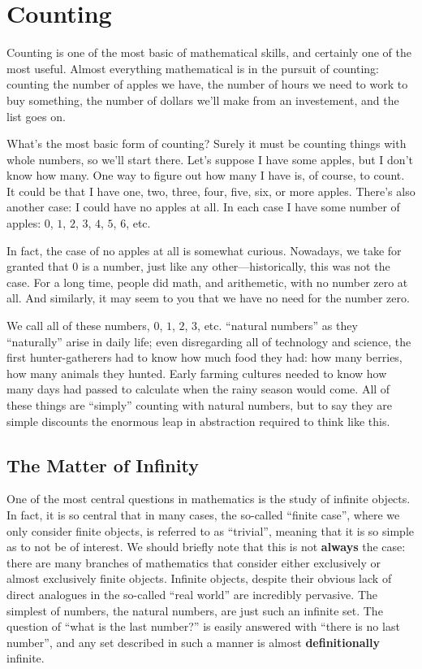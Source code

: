 \section{Counting}

Counting is one of the most basic of mathematical skills, and certainly one of the most useful.
Almost everything mathematical is in the pursuit of counting: counting the number of apples we have, the number of hours we need to work to buy something, the number of dollars we'll make from an investement, and the list goes on.

What's the most basic form of counting?
Surely it must be counting things with whole numbers, so we'll start there.
Let's suppose I have some apples, but I don't know how many.
One way to figure out how many I have is, of course, to count.
It could be that I have one, two, three, four, five, six, or more apples.
There's also another case: I could have no apples at all.
In each case I have some number of apples: $0$, $1$, $2$, $3$, $4$, $5$, $6$, etc.

In fact, the case of no apples at all is somewhat curious.
Nowadays, we take for granted that $0$ is a number, just like any other---historically, this was not the case.
For a long time, people did math, and arithemetic, with no number zero at all.
And similarly, it may seem to you that we have no need for the number zero.

We call all of these numbers, $0$, $1$, $2$, $3$, etc. ``natural numbers'' as they ``naturally'' arise in daily life; even disregarding all of technology and science, the first hunter-gatherers had to know how much food they had: how many berries, how many animals they hunted.
Early farming cultures needed to know how many days had passed to calculate when the rainy season would come.
All of these things are ``simply'' counting with natural numbers, but to say they are simple discounts the enormous leap in abstraction required to think like this.

\subsection{The Matter of Infinity}

One of the most central questions in mathematics is the study of infinite objects.
In fact, it is so central that in many cases, the so-called ``finite case'', where we only consider finite objects, is referred to as ``trivial'', meaning that it is so simple as to not be of interest.
We should briefly note that this is not \textbf{always} the case: there are many branches of mathematics that consider either exclusively or almost exclusively finite objects.
Infinite objects, despite their obvious lack of direct analogues in the so-called ``real world'' are incredibly pervasive.
The simplest of numbers, the natural numbers, are just such an infinite set.
The question of ``what is the last number?'' is easily answered with ``there is no last number'', and any set described in such a manner is almost \textbf{definitionally} infinite.

